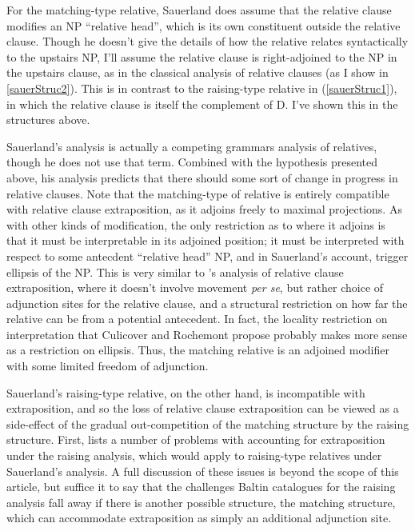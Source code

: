 \noindent For the matching-type relative, Sauerland does assume that the relative clause modifies an NP ``relative head'', which is its own constituent outside the relative clause. Though he doesn't give the details of how the relative relates syntactically to the upstairs NP, I'll assume the relative clause is right-adjoined to the NP in the upstairs clause, as in the classical analysis of relative clauses (as I show in \ref{sauerStruc2}). This is in contrast to the raising-type relative in (\ref{sauerStruc1}), in which the relative clause is itself the complement of D. I've shown this in the structures above.

Sauerland's analysis is actually a competing grammars analysis of relatives, though he does not use that term. Combined with the hypothesis presented above, his analysis predicts that there should some sort of change in progress in relative clauses. Note that the matching-type of relative is entirely compatible with relative clause extraposition, as it adjoins freely to maximal projections. As with other kinds of modification, the only restriction as to where it adjoins is that it must be interpretable in its adjoined position; it must be interpreted with respect to some antecdent ``relative head'' NP, and in Sauerland's account, trigger ellipsis of the NP. This is very similar to \citet{culicoverrochemont1990}'s analysis of relative clause extraposition, where it doesn't involve movement \textsl{per se}, but rather choice of adjunction sites for the relative clause, and a structural restriction on how far the relative can be from a potential antecedent. In fact, the locality restriction on interpretation that Culicover and Rochemont propose probably makes more sense as a restriction on ellipsis. Thus, the matching relative is an adjoined modifier with some limited freedom of adjunction.

Sauerland's raising-type relative, on the other hand, is incompatible with extraposition, and so the loss of relative clause extraposition can be viewed as a side-effect of the gradual out-competition of the matching structure by the raising structure. First, \citet{baltin2006} lists a number of problems with accounting for extraposition under the raising analysis, which would apply to raising-type relatives under Sauerland's analysis. A full discussion of these issues is beyond the scope of this article, but suffice it to say that the challenges Baltin catalogues for the raising analysis fall away if there is another possible structure, the matching structure, which can accommodate extraposition as simply an additional adjunction site.

